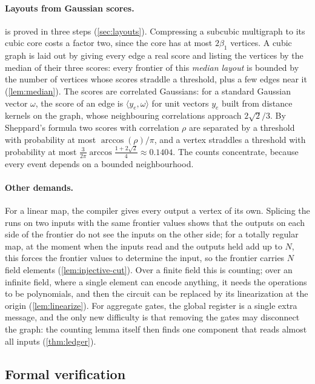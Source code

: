 \documentclass[11pt]{article}
\theoremstyle{plain}
\theoremstyle{definition}
\theoremstyle{remark}
\begin{document}
\paragraph{Layouts from Gaussian scores.}
 is proved in three steps (\cref{sec:layouts}). Compressing a subcubic
multigraph to its cubic core costs a factor two, since the core has at most $2\beta_1$ vertices.
A cubic graph is laid out by giving every edge a real score and listing the vertices by the
median of their three scores: every frontier of this \emph{median layout} is bounded by the
number of vertices whose scores straddle a threshold, plus a few edges near it
(\cref{lem:median}). The scores are correlated Gaussians: for a standard Gaussian vector
$\omega$, the score of an edge is $\langle y_e, \omega\rangle$ for unit vectors $y_e$ built
from distance kernels on the graph, whose neighbouring correlations approach $2\sqrt2/3$. By
Sheppard's formula two scores with correlation $\rho$ are separated by a threshold with
probability at most $\arccos(\rho)/\pi$, and a vertex straddles a threshold with probability at
most $\frac{3}{2\pi}\arccos\frac{1+2\sqrt2}{4} \approx 0.1404$. The counts concentrate, because
every event depends on a bounded neighbourhood.

\paragraph{Other demands.}
For a linear map, the compiler gives every output a vertex of its own. Splicing the runs on two
inputs with the same frontier values shows that the outputs on each side of the frontier do not
see the inputs on the other side; for a totally regular map, at the moment when the inputs read
and the outputs held add up to $N$, this forces the frontier values to determine the input, so
the frontier carries $N$ field elements (\cref{lem:injective-cut}). Over a finite field this is
counting; over an infinite field, where a single element can encode anything, it needs the
operations to be polynomials, and then the circuit can be replaced by its linearization at the
origin (\cref{lem:linearize}). For aggregate gates, the global register is a single extra
message, and the only new difficulty is that removing the gates may disconnect the graph: the
counting lemma itself then finds one component that reads almost all inputs
(\cref{thm:ledger}).

\subsection{Formal verification}
\label{sec:formal}
\end{document}
